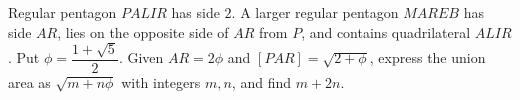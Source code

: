 Regular pentagon $PALIR$ has side $2$. A larger regular pentagon $MAREB$ has side $AR$, lies on the opposite side of $AR$ from $P$, and contains quadrilateral $ALIR$. Put $\phi=\dfrac{1+\sqrt5}{2}$. Given $AR=2\phi$ and $[PAR]=\sqrt{2+\phi}$, express the union area as $\sqrt{m+n\phi}$ with integers $m,n$, and find $m+2n$.
